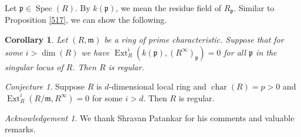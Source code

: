\documentclass[11pt,a4paper]{amsart}
\numberwithin{equation}{section}
\newtheorem{corollary}[theorem]{Corollary}
\theoremstyle{definition}
\theoremstyle{remark}
\newtheorem{conjecture}[theorem]{Conjecture}
\newtheorem{acknowledgement}{Acknowledgement}
\begin{document}
Let \(\mathfrak{p} \in \operatorname{Spec}(R)\). By \(k(\mathfrak{p})\), we mean the residue field of \(R_{\mathfrak{p}}\). Similar to {Proposition} \ref{517}, we can show the following.

\begin{corollary}\label{isom}
	Let \((R, \mathfrak{m})\) be a ring of prime characteristic. Suppose that for some \(i > \dim(R)\) we have
	\(
	\operatorname{Ext}_{R}^i(k(\mathfrak{p}), (R^\infty)_{\mathfrak{p}}) = 0
	\)
	for all \(\mathfrak{p}\) in the singular locus of \(R\). Then \(R\) is regular.
\end{corollary}

\begin{conjecture}
Suppose \(R\) is $d$-dimensional local ring and \(\operatorname{char} (R) = p > 0\) and \(\operatorname{Ext}_R^i(R/\mathfrak{m}, R^\infty) = 0\) for some $i>d$. Then \(R\) is regular.
\end{conjecture}

 
	\begin{acknowledgement}
We thank Shravan Patankar for his comments and valuable remarks.
	\end{acknowledgement}
\end{document}
